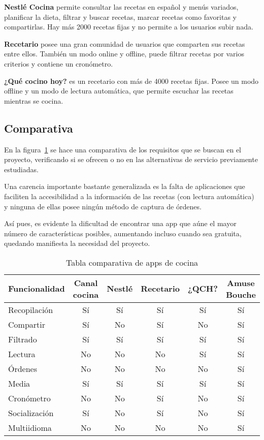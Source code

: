 \textbf{Nestlé Cocina} permite consultar las recetas en español y menús variados,
planificar la dieta, filtrar y buscar recetas, marcar recetas como favoritas
y compartirlas. Hay más 2000 recetas fijas y no permite a los usuarios subir
nada.

\textbf{Recetario} posee una gran comunidad de usuarios que comparten sus
recetas entre ellos. También un modo online y offline, puede filtrar recetas
por varios criterios y contiene un cronómetro.

\textbf{¿Qué cocino hoy?} es un recetario con más de 4000 recetas fijas. Posee
un modo offline y un modo de lectura automática, que permite escuchar las recetas
mientras se cocina.

\subsection{Comparativa}

En la figura~\ref{comparativa_apps} se hace una comparativa de los requisitos
que se buscan en el proyecto, verificando si se ofrecen o no en las alternativas
de servicio previamente estudiadas.

Una carencia importante bastante generalizada es la falta de aplicaciones que
faciliten la accesibilidad a la información de las recetas (con lectura
automática) y ninguna de ellas posee ningún método de captura de órdenes.

Así pues, es evidente la dificultad de encontrar una app que aúne el mayor
número de características posibles, aumentando incluso cuando sea gratuita,
quedando manifiesta la necesidad del proyecto.


\begin{table}[h]
  \centering
  \begin{tabular}{|l|c|c|c|c|c|}
    \hline
    Funcionalidad & Canal cocina & Nestlé & Recetario & ¿QCH? & Amuse Bouche\\
    \hline
    Recopilación & Sí & Sí & Sí & Sí & Sí \\
    \hline
    Compartir & Sí & No & Sí & No & Sí \\
    \hline
    Filtrado & Sí & Sí & Sí & Sí & Sí \\
    \hline
    Lectura & No & No & No & Sí & Sí \\
    \hline
    Órdenes & No & No & No & No & Sí \\
    \hline
    Media & Sí & Sí & Sí & Sí & Sí \\
    \hline
    Cronómetro & No & No & Sí & No & Sí \\
    \hline
    Socialización & Sí & No & Sí & No & Sí \\
    \hline
    Multiidioma & No & No & No & No & Sí \\
    \hline
  \end{tabular}
  \caption{Tabla comparativa de apps de cocina}
  \label{comparativa_apps}
\end{table}


